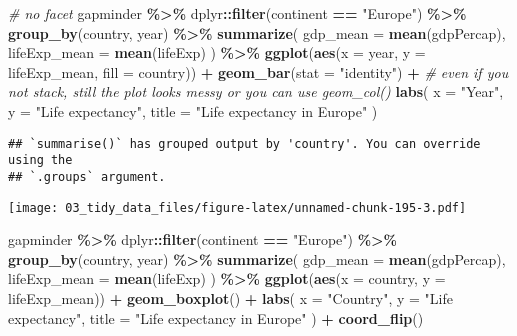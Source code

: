 \documentclass[
]{book}
\newenvironment{Shaded}{\begin{snugshade}}{\end{snugshade}}
\newcommand{\CommentTok}[1]{\textcolor[rgb]{0.56,0.35,0.01}{\textit{#1}}}
\newcommand{\DataTypeTok}[1]{\textcolor[rgb]{0.13,0.29,0.53}{#1}}
\newcommand{\KeywordTok}[1]{\textcolor[rgb]{0.13,0.29,0.53}{\textbf{#1}}}
\newcommand{\NormalTok}[1]{#1}
\newcommand{\OperatorTok}[1]{\textcolor[rgb]{0.81,0.36,0.00}{\textbf{#1}}}
\newcommand{\StringTok}[1]{\textcolor[rgb]{0.31,0.60,0.02}{#1}}
\begin{document}
\begin{Shaded}
\begin{Highlighting}[]
\CommentTok{\# no facet}
\NormalTok{gapminder }\OperatorTok{\%\textgreater{}\%}
\StringTok{  }\NormalTok{dplyr}\OperatorTok{::}\KeywordTok{filter}\NormalTok{(continent }\OperatorTok{==}\StringTok{ "Europe"}\NormalTok{) }\OperatorTok{\%\textgreater{}\%}
\StringTok{  }\KeywordTok{group\_by}\NormalTok{(country, year) }\OperatorTok{\%\textgreater{}\%}
\StringTok{  }\KeywordTok{summarize}\NormalTok{(}
    \DataTypeTok{gdp\_mean =} \KeywordTok{mean}\NormalTok{(gdpPercap),}
    \DataTypeTok{lifeExp\_mean =} \KeywordTok{mean}\NormalTok{(lifeExp)}
\NormalTok{  ) }\OperatorTok{\%\textgreater{}\%}
\StringTok{  }\KeywordTok{ggplot}\NormalTok{(}\KeywordTok{aes}\NormalTok{(}\DataTypeTok{x =}\NormalTok{ year, }\DataTypeTok{y =}\NormalTok{ lifeExp\_mean, }\DataTypeTok{fill =}\NormalTok{ country)) }\OperatorTok{+}
\StringTok{  }\KeywordTok{geom\_bar}\NormalTok{(}\DataTypeTok{stat =} \StringTok{"identity"}\NormalTok{) }\OperatorTok{+}\StringTok{ }\CommentTok{\# even if you not stack, still the plot looks messy or you can use geom\_col()}
\StringTok{  }\KeywordTok{labs}\NormalTok{(}
    \DataTypeTok{x =} \StringTok{"Year"}\NormalTok{,}
    \DataTypeTok{y =} \StringTok{"Life expectancy"}\NormalTok{,}
    \DataTypeTok{title =} \StringTok{"Life expectancy in Europe"}
\NormalTok{  )}
\end{Highlighting}
\end{Shaded}

\begin{verbatim}
## `summarise()` has grouped output by 'country'. You can override using the
## `.groups` argument.
\end{verbatim}

\texttt{[image: 03\_tidy\_data\_files/figure-latex/unnamed-chunk-195-3.pdf]}

\begin{Shaded}
\begin{Highlighting}[]
\NormalTok{gapminder }\OperatorTok{\%\textgreater{}\%}
\StringTok{  }\NormalTok{dplyr}\OperatorTok{::}\KeywordTok{filter}\NormalTok{(continent }\OperatorTok{==}\StringTok{ "Europe"}\NormalTok{) }\OperatorTok{\%\textgreater{}\%}
\StringTok{  }\KeywordTok{group\_by}\NormalTok{(country, year) }\OperatorTok{\%\textgreater{}\%}
\StringTok{  }\KeywordTok{summarize}\NormalTok{(}
    \DataTypeTok{gdp\_mean =} \KeywordTok{mean}\NormalTok{(gdpPercap),}
    \DataTypeTok{lifeExp\_mean =} \KeywordTok{mean}\NormalTok{(lifeExp)}
\NormalTok{  ) }\OperatorTok{\%\textgreater{}\%}
\StringTok{  }\KeywordTok{ggplot}\NormalTok{(}\KeywordTok{aes}\NormalTok{(}\DataTypeTok{x =}\NormalTok{ country, }\DataTypeTok{y =}\NormalTok{ lifeExp\_mean)) }\OperatorTok{+}
\StringTok{  }\KeywordTok{geom\_boxplot}\NormalTok{() }\OperatorTok{+}
\StringTok{  }\KeywordTok{labs}\NormalTok{(}
    \DataTypeTok{x =} \StringTok{"Country"}\NormalTok{,}
    \DataTypeTok{y =} \StringTok{"Life expectancy"}\NormalTok{,}
    \DataTypeTok{title =} \StringTok{"Life expectancy in Europe"}
\NormalTok{  ) }\OperatorTok{+}
\StringTok{  }\KeywordTok{coord\_flip}\NormalTok{()}
\end{Highlighting}
\end{Shaded}
\end{document}
